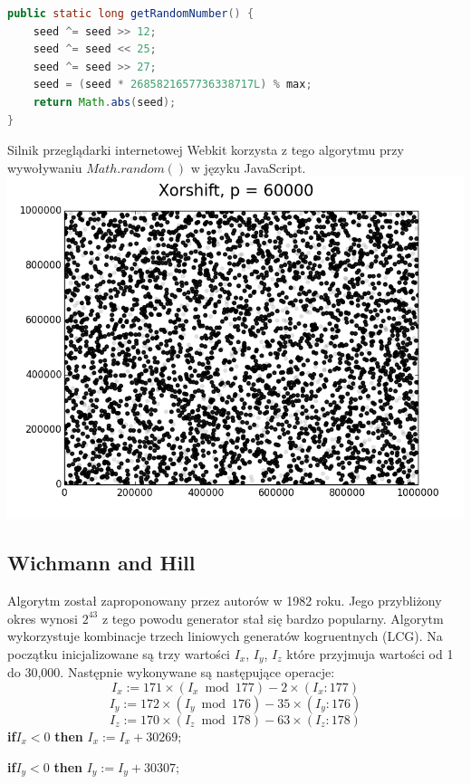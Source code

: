 \documentclass[a4paper, 11pt]{article} %
\begin{document}
\begin{lstlisting}[style=mystyle, language=java, frame=single, caption = Generowanie następnej liczby pseudolosowej przez Xorshift]
public static long getRandomNumber() {
    seed ^= seed >> 12;
    seed ^= seed << 25;
    seed ^= seed >> 27;
    seed = (seed * 2685821657736338717L) % max;
    return Math.abs(seed);
}
\end{lstlisting}
Silnik przeglądarki internetowej Webkit korzysta z tego algorytmu przy wywoływaniu $Math.random()$ w języku JavaScript.\\
\includegraphics[width=\linewidth]{img/xorshift-1.png}
\subsection{Wichmann and Hill}
Algorytm został zaproponowany przez autorów w 1982 roku. Jego przybliżony okres wynosi $2^{43}$ z tego powodu generator stał się bardzo popularny. Algorytm wykorzystuje kombinacje trzech liniowych generatów kogruentnych (LCG). Na początku inicjalizowane są trzy wartości $I_x$, $I_y$, $ I_z$ które przyjmuja wartości od 1 do 30,000. Następnie wykonywane są następujące operacje: 
$$I_x := 171 \times (I_x  \bmod  177) - 2 \times (I_x : 177) $$
$$I_y := 172 \times (I_y  \bmod 176) - 35 \times (I_y : 176) $$
$$ I_z := 170 \times (I_z \bmod  178) - 63 \times (I_z : 178)$$
\textbf{if}$I_x < 0$ \textbf{then}
\newline \indent	$I_x := I_x + 30269;$

\noindent \textbf{if}$I_y < 0$ \textbf{then}
\newline \indent	$I_y := I_y + 30307;$
\end{document}
